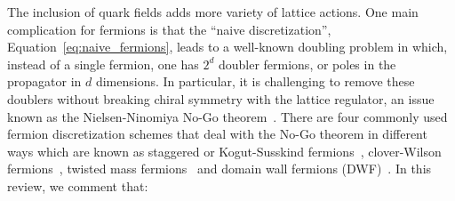 The inclusion of quark fields adds more variety of lattice actions.
One main complication for fermions is that the ``naive discretization'', Equation~\eqref{eq:naive_fermions}, leads to a well-known doubling problem in which, instead of a single fermion, one has $2^d$ doubler fermions, or poles in the propagator in $d$ dimensions.
In particular, it is challenging to remove these doublers without breaking chiral symmetry with the lattice regulator, an issue known as the Nielsen-Ninomiya No-Go theorem~\cite{Nielsen:1981hk,Nielsen:1980rz,Nielsen:1981xu}.
There are four commonly used fermion discretization schemes that deal with the No-Go theorem in different ways which are known as staggered or Kogut-Susskind fermions~\addcite{}, clover-Wilson fermions~\addcite{}, twisted mass fermions~\addcite{} and domain wall fermions (DWF)~\addcite{}.
In this review, we comment that:
